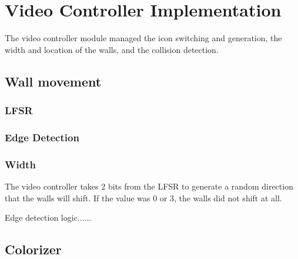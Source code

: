 \documentclass[11pt]{article}
\begin{document}
	
\section{Video Controller Implementation}
	The video controller module managed the icon switching and generation, the width and location of the walls, and the collision detection.
	

\subsection{Wall movement}

\subsubsection{LFSR}

\subsubsection{Edge Detection}

\subsubsection{Width}
The video controller takes 2 bits from the LFSR to generate a random direction that the walls will shift.  If the value was 0 or 3, the walls did not shift at all. 

Edge detection logic......
		
		\subsection{Colorizer}
		

%
\end{document}
